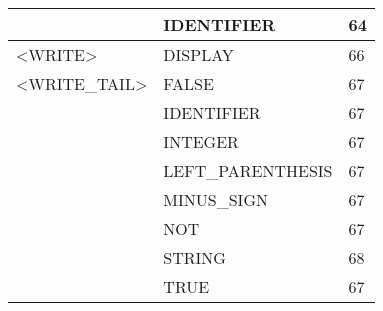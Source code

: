 \begin{longtable}{|l|l|l|}
                     &   IDENTIFIER           &   64 \\ \hline
<WRITE>                                  &   DISPLAY              &   66 \\ \hline
<WRITE\_TAIL>                            &   FALSE                &   67 \\ \hline
                     &   IDENTIFIER           &   67 \\ \hline
                     &   INTEGER              &   67 \\ \hline
                     &   LEFT\_PARENTHESIS    &   67 \\ \hline
                     &   MINUS\_SIGN          &   67 \\ \hline
                     &   NOT                  &   67 \\ \hline
                     &   STRING               &   68 \\ \hline
                     &   TRUE                 &   67 \\ \hline
\end{longtable}
